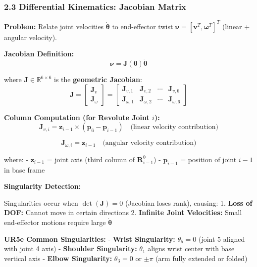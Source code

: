 \documentclass[
]{article}
\begin{document}
\hypertarget{differential-kinematics-jacobian-matrix}{%
\subsubsection{2.3 Differential Kinematics: Jacobian
Matrix}\label{differential-kinematics-jacobian-matrix}}

\textbf{Problem:} Relate joint velocities \(\dot{\boldsymbol{\theta}}\)
to end-effector twist
\(\boldsymbol{\nu} = [\boldsymbol{v}^T, \boldsymbol{\omega}^T]^T\)
(linear + angular velocity).

\textbf{Jacobian Definition:} \[
\boldsymbol{\nu} = \mathbf{J}(\boldsymbol{\theta}) \dot{\boldsymbol{\theta}}
\]

where \(\mathbf{J} \in \mathbb{R}^{6 \times 6}\) is the
\textbf{geometric Jacobian}: \[
\mathbf{J} =
\begin{bmatrix}
\mathbf{J}_v \\
\mathbf{J}_\omega
\end{bmatrix}
=
\begin{bmatrix}
\mathbf{J}_{v,1} & \mathbf{J}_{v,2} & \cdots & \mathbf{J}_{v,6} \\
\mathbf{J}_{\omega,1} & \mathbf{J}_{\omega,2} & \cdots & \mathbf{J}_{\omega,6}
\end{bmatrix}
\]

\textbf{Column Computation (for Revolute Joint \(i\)):} \[
\mathbf{J}_{v,i} = \mathbf{z}_{i-1} \times (\mathbf{p}_6 - \mathbf{p}_{i-1}) \quad \text{(linear velocity contribution)}
\]

\[
\mathbf{J}_{\omega,i} = \mathbf{z}_{i-1} \quad \text{(angular velocity contribution)}
\]

where: - \(\mathbf{z}_{i-1}\) = joint axis (third column of
\(\mathbf{R}_{i-1}^0\)) - \(\mathbf{p}_{i-1}\) = position of joint
\(i-1\) in base frame

\textbf{Singularity Detection:}

Singularities occur when \(\det(\mathbf{J}) = 0\) (Jacobian loses rank),
causing: 1. \textbf{Loss of DOF:} Cannot move in certain directions 2.
\textbf{Infinite Joint Velocities:} Small end-effector motions require
large \(\dot{\boldsymbol{\theta}}\)

\textbf{UR5e Common Singularities:} - \textbf{Wrist Singularity:}
\(\theta_5 = 0\) (joint 5 aligned with joint 4 axis) - \textbf{Shoulder
Singularity:} \(\theta_1\) aligns wrist center with base vertical axis -
\textbf{Elbow Singularity:} \(\theta_3 = 0\) or \(\pm\pi\) (arm fully
extended or folded)
\end{document}
